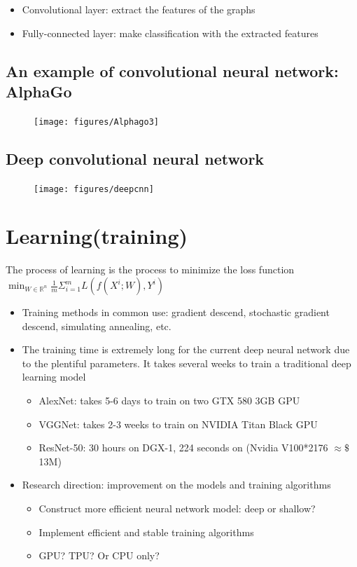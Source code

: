 \begin{itemize}
\item Convolutional layer: extract the features of the graphs
\item Fully-connected layer: make classification with the extracted features
\end{itemize}




\subsection{An example of convolutional neural network: AlphaGo}
\begin{figure}[H]
\centering
\texttt{[image: figures/Alphago3]}
\end{figure}



\subsection{Deep convolutional neural network}
\begin{figure}[H]
\centering
\texttt{[image: figures/deepcnn]}
\end{figure}



\section{Learning(training)}
The process of learning is the process to minimize the loss function
$\min_{W\in \mathbb{R}^n}\frac{1}{m}\Sigma^m_{i=1}L(f(X^i;W),Y^i)$

\begin{itemize}
\item Training methods in common use: gradient descend, stochastic gradient descend, simulating annealing, etc.

\item The training time is extremely long for the current deep neural network due to the plentiful parameters. It takes several weeks to train a traditional deep learning model
\begin{itemize}
\item AlexNet: takes 5-6 days to train on two GTX 580 3GB GPU
\item VGGNet: takes 2-3 weeks to train on NVIDIA Titan Black GPU
\item ResNet-50: 30 hours on DGX-1, 224 seconds on (Nvidia V100*2176 $\approx \$$ 13M)
\end{itemize}
\item Research direction: improvement on the models and training algorithms
\begin{itemize}
\item Construct more efficient neural network model: deep or shallow?

\item Implement efficient and stable training algorithms

\item GPU? TPU? Or CPU only?
\end{itemize}
\end{itemize}



